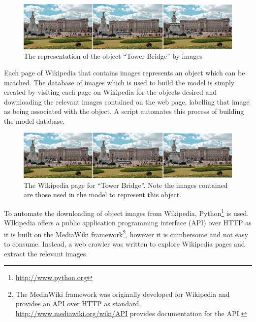 \documentclass[11pt, onecolumn, a4paper, final]{report} %
\begin{document}
\begin{figure}[htb]
\centering 
\includegraphics{images/intimage.png}
\caption{The representation of the object ``Tower Bridge'' by images}
\label{fig:towerbridge}
\end{figure}

Each page of Wikipedia that contains images represents an object which can be matched. The database of images which is used to build the model is simply created by visiting each page on Wikipedia for the objects desired and downloading the relevant images contained on the web page, labelling that image as being associated with the object. A script automates this process of building the model database.

\begin{figure}[htb]
\centering 
\includegraphics{images/intimage.png}
\caption{The Wikipedia page for ``Tower Bridge''. Note the images contained are those used in the model to represent this object.}
\label{fig:wikipage}
\end{figure}

To automate the downloading of object images from Wikipedia, Python\footnote{\url{http://www.python.org}} is used. WIkipedia offers a public application programming interface (API) over HTTP as it is built on the MediaWiki framework\footnote{The MediaWiki framework was originally developed for Wikipedia and provides an API over HTTP as standard. \url{http://www.mediawiki.org/wiki/API} provides documentation for the API.}, however it is cumbersome and not easy to consume. Instead, a web crawler was written to explore Wikipedia pages and extract the relevant images. 
\end{document}
